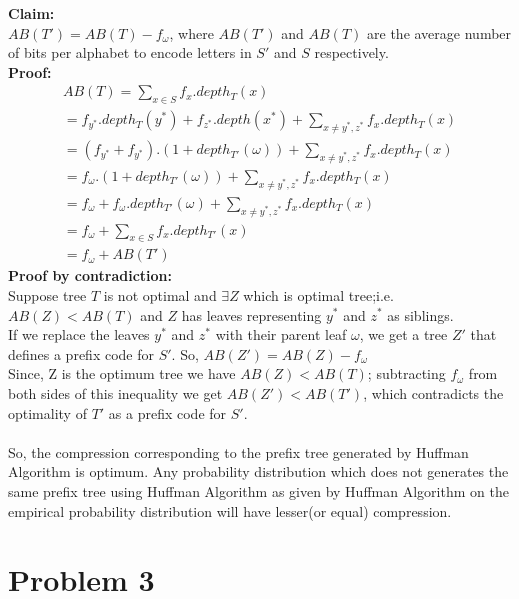 \documentclass[paper=a4, fontsize=11pt]{scrartcl} %
\numberwithin{equation}{section} %
\numberwithin{figure}{section} %
\numberwithin{table}{section} %
\begin{document}
\textbf{Claim:}\\
$AB(T') = AB(T) - f_\omega$, where $AB(T')$ and $AB(T)$ are the average number of bits per alphabet to encode letters in $S'$ and $S$ respectively.\\
\textbf{Proof:}
\begin{align*}
	AB(T) = \sum_{x\in S}f_x. depth_T(x)\\
	=f_{y^*}.depth_T(y^*)+f_{z^*}.depth(x^*) + \sum_{x\neq y^*,z^*}f_x.depth_T(x)\\
	=(f_{y^*} + f_{y^*}).(1 + depth_{	T'}(\omega)) + \sum_{x\neq y^*,z^*}f_x.depth_T(x)\\
	=f_{\omega}.(1 + depth_{T'}(\omega)) + \sum_{x\neq y^*,z^*}f_x.depth_T(x)\\
	=f_{\omega} + f_{\omega}.depth_{T'}(\omega) + \sum_{x\neq y^*,z^*}f_x.depth_T(x)\\				
		=f_{\omega} + \sum_{x\in S}f_x.depth_{T'}(x)\\
		=f_\omega + AB(T')				
\end{align*}
\textbf{Proof by contradiction:}\\
Suppose tree $T$ is not optimal and $\exists Z$ which is optimal tree;i.e. $AB(Z)< AB(T)$ and $Z$ has leaves representing $y^*$ and $z^*$ as siblings.\\
If we replace the leaves $y^*$ and $z^*$ with their parent leaf $\omega$, we get a tree $Z'$ that defines a prefix code for $S'$. So, $AB(Z')= AB(Z)-f_\omega$\\
Since, Z is the optimum tree we have $AB(Z)< AB(T)$; subtracting $f_\omega$ from both sides of this inequality we get $AB(Z')< AB(T')$, which contradicts the optimality of $T'$ as a prefix code for $S'$. \\\\
So, the compression corresponding to the prefix tree generated by Huffman Algorithm is optimum. 
Any probability distribution which does not generates the same prefix tree using Huffman Algorithm as given by Huffman Algorithm on the empirical probability distribution will have lesser(or equal) compression.

\section{Problem 3}
\end{document}
